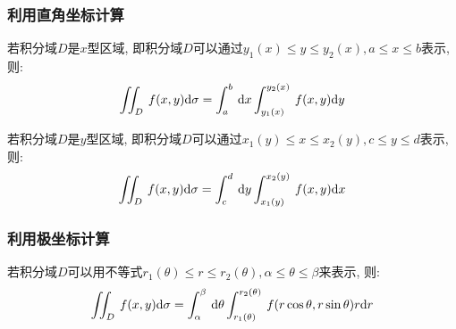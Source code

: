 \subsubsection{利用直角坐标计算}
\par \vspace{.5em}
若积分域$ D $是$ x $型区域, 即积分域$ D $可以通过$ y_{1}(x)\le y\le y_{2}(x), a\le x\le b $表示, 则:
\begin{equation*}
\displaystyle\iint_{D}^{}\hspace{.2em}f(x,y)\mathrm{d}\sigma=\displaystyle\int_{a}^{b}\hspace{.2em}\mathrm{d}x\displaystyle\int_{y_{1}(x)}^{y_{2}(x)}\hspace{.2em}f(x,y)\mathrm{d}y
\end{equation*}\par
{}\par \vspace{.5em}
若积分域$ D $是$ y $型区域, 即积分域$ D $可以通过$ x_{1}(y)\le x\le x_{2}(y), c\le y\le d $表示, 则:
\begin{equation*}
\displaystyle\iint_{D}^{}\hspace{.2em}f(x,y)\mathrm{d}\sigma=\displaystyle\int_{c}^{d}\hspace{.2em}\mathrm{d}y\displaystyle\int_{x_{1}(y)}^{x_{2}(y)}\hspace{.2em}f(x,y)\mathrm{d}x
\end{equation*}
\subsubsection{利用极坐标计算}
\par \vspace{.5em}
若积分域$ D $可以用不等式$ r_{1}(\theta)\le r\le r_{2}(\theta), \alpha\le \theta\le \beta $来表示, 则:
\begin{equation*}
\displaystyle\iint_{D}^{}\hspace{.2em}f(x,y)\mathrm{d}\sigma=\displaystyle\int_{\alpha}^{\beta}\hspace{.2em}\mathrm{d}\theta\displaystyle\int_{r_{1}(\theta)}^{r_{2}(\theta)}\hspace{.2em}f(r\cos \theta, r\sin\theta)r \mathrm{d}r
\end{equation*}
